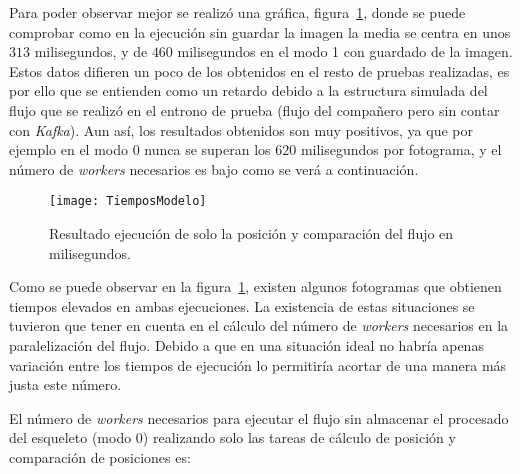 {\begin{table}[h]
	\centering
	\caption{Tabla con los resultados de la ejecución solo de la posición y comparación del flujo en milisegundos.}
	\label{tab:res1}
\end{table}

Para poder observar mejor se realizó una gráfica, figura~\ref{fig:res1}, donde se puede comprobar como en la ejecución sin guardar la imagen la media se centra en unos $313$ milisegundos, y de $460$ milisegundos en el modo 1 con guardado de la imagen. Estos datos difieren un poco de los obtenidos en el resto de pruebas realizadas, es por ello que se entienden como un retardo debido a la estructura simulada del flujo que se realizó en el entrono de prueba (flujo del compañero pero sin contar con \textit{Kafka}). Aun así, los resultados obtenidos son muy positivos, ya que por ejemplo en el modo 0 nunca se superan los $620$ milisegundos por fotograma, y el número de \textit{workers} necesarios es bajo como se verá a continuación.

\begin{figure}[h]
	\centering
	\texttt{[image: TiemposModelo]}
	\caption{Resultado ejecución de solo la posición y comparación del flujo en milisegundos.}
	\label{fig:res1}
\end{figure}

Como se puede observar en la figura~\ref{fig:res1}, existen algunos fotogramas que obtienen tiempos elevados en ambas ejecuciones. La existencia de estas situaciones se tuvieron que tener en cuenta en el cálculo del número de \textit{workers} necesarios en la paralelización del flujo. Debido a que en una situación ideal no habría apenas variación entre los tiempos de ejecución lo permitiría acortar de una manera más justa este número.

El número de \textit{workers} necesarios para ejecutar el flujo sin almacenar el procesado del esqueleto (modo 0) realizando solo las tareas de cálculo de posición y comparación de posiciones es:

}
